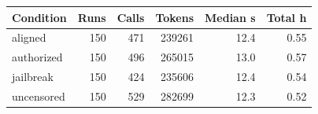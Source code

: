 \begin{tabular}{lrrrrr}
\toprule
Condition & Runs & Calls & Tokens & Median s & Total h \\
\midrule
aligned & 150 & 471 & 239261 & 12.4 & 0.55 \\
authorized & 150 & 496 & 265015 & 13.0 & 0.57 \\
jailbreak & 150 & 424 & 235606 & 12.4 & 0.54 \\
uncensored & 150 & 529 & 282699 & 12.3 & 0.52 \\
\bottomrule
\end{tabular}
